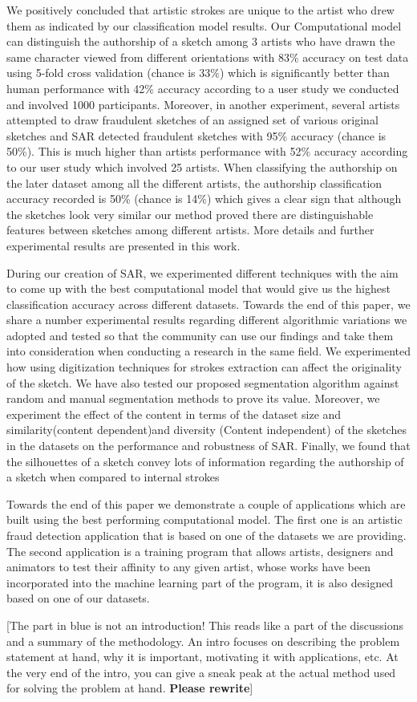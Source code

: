 {\color{blue}We positively concluded that artistic strokes are unique to the artist who drew them as indicated by our classification model results. Our Computational model can distinguish the authorship of a sketch among 3 artists who have drawn the same character viewed from different orientations with 83\% accuracy on test data using 5-fold cross validation (chance is 33\%) which is significantly better than human performance with 42\% accuracy according to a user study we conducted and involved 1000 participants.  Moreover, in another experiment, several artists attempted to draw fraudulent sketches of an assigned set of various original sketches and SAR detected fraudulent sketches with 95\% accuracy (chance is 50\%). This is much higher than artists performance with 52\% accuracy according to our user study which involved 25 artists. When classifying the authorship on the later dataset among all the different artists, the authorship classification accuracy recorded is 50\% (chance is 14\%) which gives a clear sign that although the sketches look very similar our method proved there are distinguishable features between sketches among different artists. More details and further experimental results are presented in this work.

During our creation of SAR, we experimented different techniques with the aim to come up with the best computational model that would give us the highest classification accuracy across different datasets. Towards the end of this paper, we share a number experimental results regarding different algorithmic variations we adopted and tested so that the community can use our findings and take them into consideration when conducting a research in the same field. We experimented how using digitization techniques for strokes extraction can affect the originality of the sketch. We have also tested our proposed segmentation algorithm against random and manual segmentation methods to prove its value. Moreover, we experiment the effect of the content in terms of the dataset size and similarity(content dependent)and diversity (Content independent) of the sketches in the datasets on the performance and robustness of SAR. Finally, we found that the silhouettes of a sketch convey lots of information regarding the authorship of a sketch when compared to internal strokes

Towards the end of this paper we demonstrate a couple of applications which are built using the best performing computational model. The first one is an artistic fraud detection application that is based on one of the datasets we are providing. The second application is a training program that allows artists, designers and animators to test their affinity to any given artist, whose works have been incorporated into the machine learning part of the program, it is also designed based on one of our datasets.} {\color{red} [The part in blue is not an introduction! This reads like a part of the discussions and a summary of the methodology. An intro focuses on describing the problem statement at hand, why it is important, motivating it with applications, etc. At the very end of the intro, you can give a sneak peak at the actual method used for solving the problem at hand. \textbf{Please rewrite}]}

